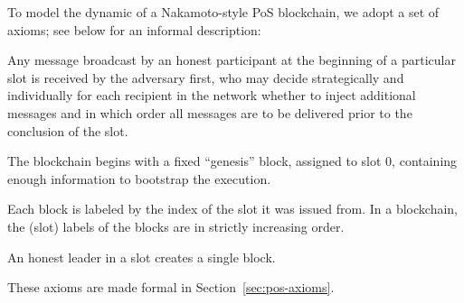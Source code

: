 To model the dynamic of a Nakamoto-style PoS blockchain, 
we adopt a set of axioms; see below for an informal description:

\begin{description}[font=\normalfont\itshape\space]
  \item[Message delivery.] 
    Any message broadcast by an honest participant at the beginning of a
    particular slot is received by the adversary first, who may decide
    strategically and individually for each recipient in the network
    whether to inject additional messages and in which order all messages
    are to be delivered prior to the conclusion of the slot. 

  \item[Genesis block.]
  The blockchain begins with a fixed ``genesis'' block, assigned to slot $0$, 
  containing enough information to bootstrap the execution.
  
  \item[Block label monotonicity.] 
  Each block is labeled by the index of the slot it was issued from. 
  In a blockchain, the (slot) labels of the blocks are in strictly increasing order.

  \item[Honest blocks.] 
  An honest leader in a slot creates a single block.
\end{description}
These axioms are made formal in Section~\ref{sec:pos-axioms}.










